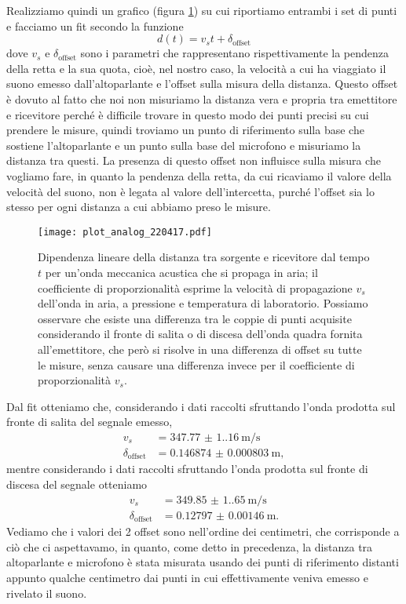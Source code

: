 \documentclass[
    rmp,
    reprint, 
    superscriptaddress, 
    altaffilletter, 
    amsmath, 
    amssymb, 
    a4paper,
    varvw]{revtex4-2}
\begin{document}
Realizziamo quindi un grafico (figura \ref{fig:analog_plot_d1}) su cui riportiamo entrambi i set di punti e facciamo un fit secondo la funzione \begin{equation}
    d(t)=v_s t+\delta_\text{offset}
\end{equation} dove $v_s$ e $\delta_\text{offset}$ sono i parametri che rappresentano rispettivamente la pendenza della retta e la sua quota, cioè, nel nostro caso, la velocità a cui ha viaggiato il suono emesso dall'altoparlante e l'offset sulla misura della distanza. Questo offset è dovuto al fatto che noi non misuriamo la distanza vera e propria tra emettitore e ricevitore perché è difficile trovare in questo modo dei punti precisi su cui prendere le misure, quindi troviamo un punto di riferimento sulla base che sostiene l'altoparlante e un punto sulla base del microfono e misuriamo la distanza tra questi. La presenza di questo offset non influisce sulla misura che vogliamo fare, in quanto la pendenza della retta, da cui ricaviamo il valore della velocità del suono, non è legata al valore dell'intercetta, purché l'offset sia lo stesso per ogni distanza a cui abbiamo preso le misure.

\begin{figure}[!t]
    \centering
    \texttt{[image: plot\_analog\_220417.pdf]}
    \caption{Dipendenza lineare della distanza tra sorgente e ricevitore dal tempo $t$ per un'onda meccanica acustica che si propaga in aria; il coefficiente di proporzionalità esprime la velocità di propagazione $v_s$ dell'onda in aria, a pressione e temperatura di laboratorio. Possiamo osservare che esiste una differenza tra le coppie di punti acquisite considerando il fronte di salita o di discesa dell'onda quadra fornita all'emettitore, che però si risolve in una differenza di offset su tutte le misure, senza causare una differenza invece per il coefficiente di proporzionalità $v_s$.}\label{fig:analog_plot_d1}
\end{figure}

Dal fit otteniamo che, considerando i dati raccolti sfruttando l'onda prodotta sul fronte di salita del segnale emesso, \begin{align*}
    v_s &=\SI{347.77(1.16)}{\metre\per\second}\\
    \delta_\text{offset} &=\SI{0.146874(803)}{\metre},
\end{align*} mentre considerando i dati raccolti sfruttando l'onda prodotta sul fronte di discesa del segnale otteniamo \begin{align*}
    v_s &=\SI{349.85(1.65)}{\metre\per\second}\\
    \delta_\text{offset} &=\SI{0.12797(146)}{\metre}.
\end{align*}
Vediamo che i valori dei 2 offset sono nell'ordine dei centimetri, che corrisponde a ciò che ci aspettavamo, in quanto, come detto in precedenza, la distanza tra altoparlante e microfono è stata misurata usando dei punti di riferimento distanti appunto qualche centimetro dai punti in cui effettivamente veniva emesso e rivelato il suono. 
\end{document}
